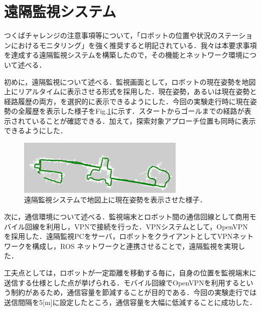 \documentclass[10pt,a4paper]{jarticle}
\begin{document}
\section{遠隔監視システム}
\label{sec:remote_monitor}
つくばチャレンジの注意事項等について，「ロボットの位置や状況のステーションにおけるモニタリング」を強く推奨すると明記されている．我々は本要求事項を達成する遠隔監視システムを構築したので，その機能とネットワーク環境について述べる．

初めに，遠隔監視について述べる．監視画面として，ロボットの現在姿勢を地図上にリアルタイムに表示させる形式を採用した．現在姿勢，あるいは現在姿勢と経路履歴の両方，を選択的に表示できるようにした．今回の実験走行時に現在姿勢の全履歴を表示した様子をFig.\ref{monitor}に示す．スタートからゴールまでの経路が表示されていることが確認できる．加えて，探索対象アプローチ位置も同時に表示できるようにした．

\begin{figure}
    \centering
    \includegraphics[width=8cm]{fig/png/monitor.png}
    \caption{遠隔監視システムで地図上に現在姿勢を表示させた様子．}
    \label{monitor}
\end{figure}

次に，通信環境について述べる．監視端末とロボット間の通信回線として商用モバイル回線を利用し，VPNで接続を行った．VPNシステムとして，OpenVPN \cite{openvpn} を採用した．遠隔監視PCをサーバ，ロボットをクライアントとしてVPNネットワークを構成し，ROS ネットワークと連携させることで，遠隔監視を実現した．

工夫点としては，ロボットが一定距離を移動する毎に，自身の位置を監視端末に送信する仕様とした点が挙げられる．モバイル回線でOpenVPNを利用するという制約があるため，通信容量を節減することが目的である．今回の実験走行では送信間隔を5[m]に設定したところ，通信容量を大幅に低減することに成功した．
\end{document}
